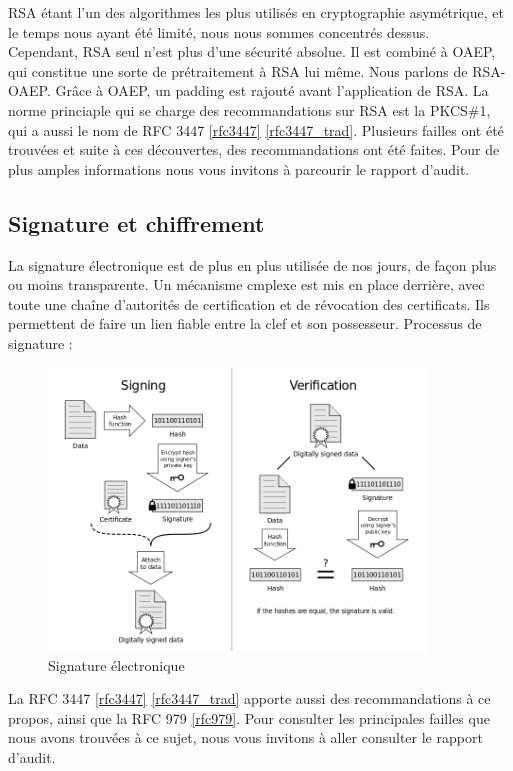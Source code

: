 RSA étant l'un des algorithmes les plus utilisés en cryptographie asymétrique, et le temps nous ayant été limité, nous nous sommes concentrés dessus.\\
Cependant, RSA seul n'est plus d'une sécurité absolue. Il est combiné à OAEP, qui constitue une sorte de prétraitement à RSA lui même. Nous parlons de RSA-OAEP. Grâce à OAEP, un padding est rajouté avant l'application de RSA. La norme princiaple qui se charge des recommandations sur RSA est la PKCS\#1, qui a aussi le nom de RFC 3447 \ref{rfc3447} \ref{rfc3447_trad}.
Plusieurs failles ont été trouvées et suite à ces découvertes, des recommandations ont été faites. Pour de plus amples informations nous vous invitons à parcourir le rapport d'audit.

\subsection{Signature et chiffrement}
La signature électronique est de plus en plus utilisée de nos jours, de façon plus ou moins transparente. Un mécanisme cmplexe est mis en place derrière, avec toute une chaîne d'autorités de certification et de révocation des certificats. Ils permettent de faire un lien fiable entre la clef et son possesseur. Processus de signature : 
\begin{figure}[H]
\begin{center}
\includegraphics[width=10cm]{images/sig_dig.png}
\end{center}
\caption{Signature électronique}
\label{digital sig}
\end{figure}

La RFC 3447 \ref{rfc3447} \ref{rfc3447_trad} apporte aussi des recommandations à ce propos, ainsi que la RFC 979 \ref{rfc979}. Pour consulter les principales failles que nous avons trouvées à ce sujet, nous vous invitons à aller consulter le rapport d'audit.

